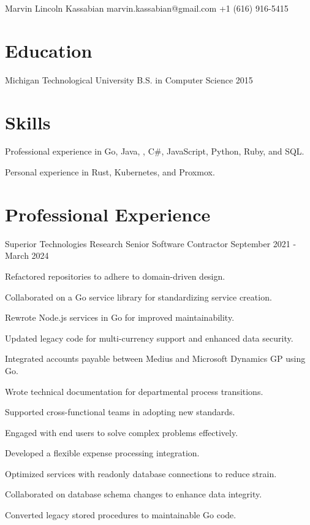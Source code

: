 \documentclass{marvinkassabian_resume}
\begin{document}
\resumeheadersimple
{Marvin Lincoln Kassabian}
{marvin.kassabian@gmail.com}
{+1 (616) 916-5415}

\section{Education}
\subsectionlocationdate
{Michigan Technological University}
{B.S. in Computer Science}
{2015}

\section{Skills}
\resumesublistbegin
\item Professional experience in Go, Java, \cpp, C\#, JavaScript, Python, Ruby, and SQL.
\item Personal experience in Rust, Kubernetes, and Proxmox.
\resumesublistend

\section{Professional Experience}

\subsectionpositiondate
{Superior Technologies Research}
{Senior Software Contractor}
{September 2021 - March 2024}
\resumesublistbegin
\item Refactored repositories to adhere to domain-driven design.
\item Collaborated on a Go service library for standardizing service creation.
\item Rewrote Node.js services in Go for improved maintainability.
\item Updated legacy code for multi-currency support and enhanced data security.
\item Integrated accounts payable between Medius and Microsoft Dynamics GP using Go.
\item Wrote technical documentation for departmental process transitions.
\item Supported cross-functional teams in adopting new standards.
\item Engaged with end users to solve complex problems effectively.
\item Developed a flexible expense processing integration.
\item Optimized services with readonly database connections to reduce strain.
\item Collaborated on database schema changes to enhance data integrity.
\item Converted legacy stored procedures to maintainable Go code.
\resumesublistend
\end{document}
